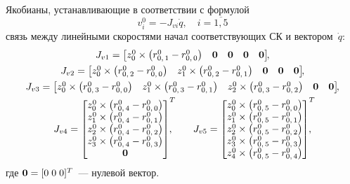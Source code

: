 Якобианы, устанавливающие в соответствии с формулой
\begin{equation}\label{eq_work_of_lin_jacobians}
    v^0_{i} = -J_{vi}\dot{q}, \quad i = \overline{1,5}
\end{equation}
связь между линейными скоростями начал соответствующих СК и вектором~$\dot{q}$:
\begin{gather}
    J_{v1} =
    \begin{bmatrix}
        z^0_0 \times \left( r^0_{0,\,1} - r^0_{0,\,0}\right) & \nv & \nv & \nv & \nv
    \end{bmatrix}\!\!,
    \\
    J_{v2} =
    \begin{bmatrix}
        z^0_0 \times \left( r^0_{0,\,2} - r^0_{0,\,0}\right) & z^0_1 \times \left( r^0_{0,\,2} - r^0_{0,\,1}\right) & \nv & \nv & \nv
    \end{bmatrix}\!\!,
    \\
    J_{v3} =
    \begin{bmatrix}
        z^0_0 \times \left( r^0_{0,\,3} - r^0_{0,\,0}\right) & z^0_1 \times \left( r^0_{0,\,3} - r^0_{0,\,1}\right) &
        z^0_2 \times \left( r^0_{0,\,3} - r^0_{0,\,2}\right) & \nv & \nv
    \end{bmatrix}\!\!,
    \\
    J_{v4} =
    \begin{bmatrix}
        z^0_0 \times \left( r^0_{0,\,4} - r^0_{0,\,0}\right) \\
        z^0_1 \times \left( r^0_{0,\,4} - r^0_{0,\,1}\right) \\
        z^0_2 \times \left( r^0_{0,\,4} - r^0_{0,\,2}\right) \\
        z^0_3 \times \left( r^0_{0,\,4} - r^0_{0,\,3}\right) \\
        \nv
    \end{bmatrix}^T\!\!\!\!\!,
    \qquad
    J_{v5} =
    \begin{bmatrix}
        z^0_0 \times \left( r^0_{0,\,5} - r^0_{0,\,0}\right) \\
        z^0_1 \times \left( r^0_{0,\,5} - r^0_{0,\,1}\right) \\
        z^0_2 \times \left( r^0_{0,\,5} - r^0_{0,\,2}\right) \\
        z^0_3 \times \left( r^0_{0,\,5} - r^0_{0,\,3}\right) \\
        z^0_4 \times \left( r^0_{0,\,5} - r^0_{0,\,4}\right)
    \end{bmatrix}^T\!\!\!\!\!,
\end{gather}
где $\mathbf0 = [0\;0\;0]^T$~--- нулевой вектор.


